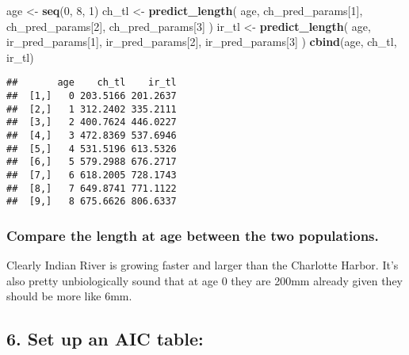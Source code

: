 \documentclass[
]{article}
\newenvironment{Shaded}{\begin{snugshade}}{\end{snugshade}}
\newcommand{\DecValTok}[1]{\textcolor[rgb]{0.00,0.00,0.81}{#1}}
\newcommand{\KeywordTok}[1]{\textcolor[rgb]{0.13,0.29,0.53}{\textbf{#1}}}
\newcommand{\NormalTok}[1]{#1}
\newcommand{\StringTok}[1]{\textcolor[rgb]{0.31,0.60,0.02}{#1}}
\begin{document}
\begin{Shaded}
\begin{Highlighting}[]
\NormalTok{age \textless{}{-}}\StringTok{ }\KeywordTok{seq}\NormalTok{(}\DecValTok{0}\NormalTok{, }\DecValTok{8}\NormalTok{, }\DecValTok{1}\NormalTok{)}
\NormalTok{ch\_tl \textless{}{-}}\StringTok{ }\KeywordTok{predict\_length}\NormalTok{(}
\NormalTok{  age, ch\_pred\_params[}\DecValTok{1}\NormalTok{], ch\_pred\_params[}\DecValTok{2}\NormalTok{], ch\_pred\_params[}\DecValTok{3}\NormalTok{]}
\NormalTok{)}
\NormalTok{ir\_tl \textless{}{-}}\StringTok{ }\KeywordTok{predict\_length}\NormalTok{(}
\NormalTok{  age, ir\_pred\_params[}\DecValTok{1}\NormalTok{], ir\_pred\_params[}\DecValTok{2}\NormalTok{], ir\_pred\_params[}\DecValTok{3}\NormalTok{]}
\NormalTok{)}
\KeywordTok{cbind}\NormalTok{(age, ch\_tl, ir\_tl)}
\end{Highlighting}
\end{Shaded}

\begin{verbatim}
##       age    ch_tl    ir_tl
##  [1,]   0 203.5166 201.2637
##  [2,]   1 312.2402 335.2111
##  [3,]   2 400.7624 446.0227
##  [4,]   3 472.8369 537.6946
##  [5,]   4 531.5196 613.5326
##  [6,]   5 579.2988 676.2717
##  [7,]   6 618.2005 728.1743
##  [8,]   7 649.8741 771.1122
##  [9,]   8 675.6626 806.6337
\end{verbatim}

\hypertarget{compare-the-length-at-age-between-the-two-populations.}{%
\subsubsection{Compare the length at age between the two
populations.}\label{compare-the-length-at-age-between-the-two-populations.}}

Clearly Indian River is growing faster and larger than the Charlotte
Harbor. It's also pretty unbiologically sound that at age 0 they are
200mm already given they should be more like 6mm.

\hypertarget{set-up-an-aic-table}{%
\subsection{6. Set up an AIC table:}\label{set-up-an-aic-table}}
\end{document}
